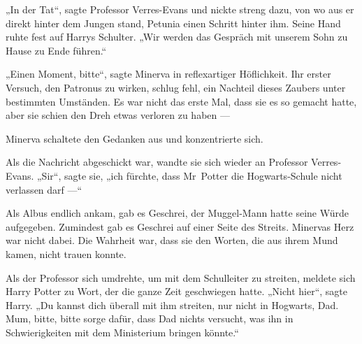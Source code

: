 „In der Tat“, sagte Professor Verres-Evans und nickte streng dazu, von wo aus er direkt hinter dem Jungen stand, Petunia einen Schritt hinter ihm. Seine Hand ruhte fest auf Harrys Schulter.
„Wir werden das Gespräch mit unserem Sohn zu Hause zu Ende führen.“

„Einen Moment, bitte“, sagte Minerva in reflexartiger Höflichkeit. Ihr erster Versuch, den Patronus zu wirken, schlug fehl, ein Nachteil dieses Zaubers unter bestimmten Umständen. Es war nicht das erste Mal, dass sie es so gemacht hatte, aber sie schien den Dreh etwas verloren zu haben —

Minerva schaltete den Gedanken aus und konzentrierte sich.

Als die Nachricht abgeschickt war, wandte sie sich wieder an Professor Verres-Evans.
„Sir“, sagte sie, „ich fürchte, dass Mr~Potter die Hogwarts-Schule nicht verlassen darf —“

Als Albus endlich ankam, gab es Geschrei, der Muggel-Mann hatte seine Würde aufgegeben. Zumindest gab es Geschrei auf einer Seite des Streits. Minervas Herz war nicht dabei. Die Wahrheit war, dass sie den Worten, die aus ihrem Mund kamen, nicht trauen konnte.

Als der Professor sich umdrehte, um mit dem Schulleiter zu streiten, meldete sich Harry Potter zu Wort, der die ganze Zeit geschwiegen hatte.
„Nicht hier“, sagte Harry.
„Du kannst dich überall mit ihm streiten, nur nicht in Hogwarts, Dad. Mum, bitte, bitte sorge dafür, dass Dad nichts versucht, was ihn in Schwierigkeiten mit dem Ministerium bringen könnte.“

